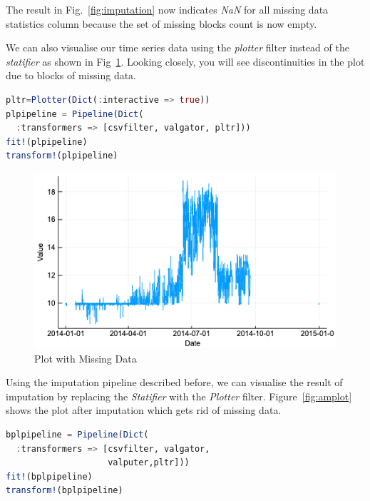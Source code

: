 \documentclass{juliacon}
\begin{document}
The result in Fig.~\ref{fig:imputation} now indicates \emph{NaN} for all missing data statistics column because the set 
of missing blocks count is now empty.

\vskip 6pt

We can also visualise our time series data using the \emph{plotter} filter instead of the \emph{statifier} as shown in Fig~\ref{fig:mplot}. Looking closely, you will see discontinuities in the plot due to blocks of missing data.

\begin{lstlisting}[language = Julia]
pltr=Plotter(Dict(:interactive => true))
plpipeline = Pipeline(Dict(
  :transformers => [csvfilter, valgator, pltr]))
fit!(plpipeline)
transform!(plpipeline)
\end{lstlisting}

\begin{figure}[htbp]
   \centering
   \includegraphics[width=\columnwidth]{mplot.png} %
   \caption{Plot with Missing Data}
   \label{fig:mplot}
\end{figure}

Using the imputation pipeline described before, we can visualise the result of imputation by replacing the \emph{Statifier} with the \emph{Plotter} filter. Figure~\ref{fig:amplot} shows the plot after imputation which gets rid of missing data.

\begin{lstlisting}[language = Julia]
bplpipeline = Pipeline(Dict(
  :transformers => [csvfilter, valgator, 
                    valputer,pltr]))
fit!(bplpipeline)
transform!(bplpipeline)
\end{lstlisting}
\end{document}
